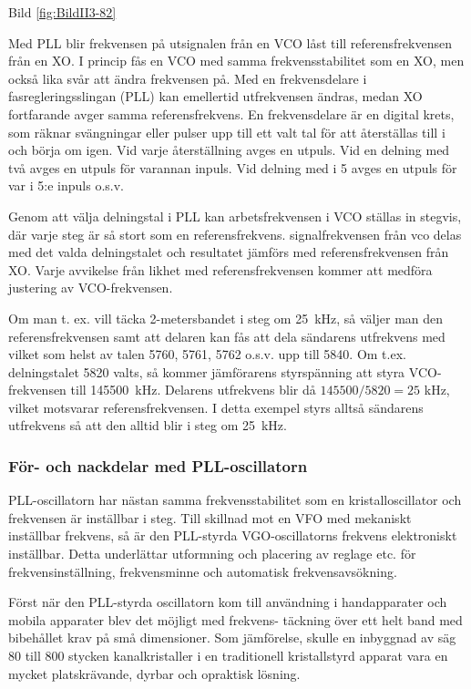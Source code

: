 Bild \ref{fig:BildII3-82}

Med PLL blir frekvensen på utsignalen från en VCO låst till
referensfrekvensen från en XO. I princip fås en VCO med samma
frekvensstabilitet som en XO, men också lika svår att ändra frekvensen
på. Med en frekvensdelare i fasregleringsslingan (PLL) kan emellertid
utfrekvensen ändras, medan XO fortfarande avger samma
referensfrekvens.  En frekvensdelare är en digital krets, som räknar
svängningar eller pulser upp till ett valt tal för att återställas
till i och börja om igen. Vid varje återställning avges en utpuls.
Vid en delning med två avges en utpuls för varannan inpuls. Vid
delning med i 5 avges en utpuls för var i 5:e inpuls o.s.v.

Genom att välja delningstal i PLL kan arbetsfrekvensen i VCO ställas
in stegvis, där varje steg är så stort som en
referensfrekvens. signalfrekvensen från vco delas med det valda
delningstalet och resultatet jämförs med referensfrekvensen från XO.
Varje avvikelse från likhet med referensfrekvensen kommer att
medföra justering av VCO-frekvensen.

Om man t. ex. vill täcka 2-metersbandet i steg om 25~kHz, så väljer
man den referensfrekvensen samt att delaren kan fås att dela sändarens
utfrekvens med vilket som helst av talen 5760, 5761, 5762 o.s.v. upp
till 5840. Om t.ex. delningstalet 5820 valts, så kommer jämförarens
styrspänning att styra VCO-frekvensen till 145500~kHz. Delarens
utfrekvens blir då \(145500/5820 = 25\) kHz, vilket motsvarar
referensfrekvensen. I detta exempel styrs alltså sändarens utfrekvens
så att den alltid blir i steg om 25~kHz.

\subsubsection{För- och nackdelar med PLL-oscillatorn}

PLL-oscillatorn har nästan samma frekvensstabilitet som en
kristalloscillator och frekvensen är inställbar i steg. Till skillnad
mot en VFO med mekaniskt inställbar frekvens, så är den PLL-styrda
VGO-oscillatorns frekvens elektroniskt inställbar. Detta underlättar
utformning och placering av reglage etc. för frekvensinställning,
frekvensminne och automatisk frekvensavsökning.

Först när den PLL-styrda oscillatorn kom till användning i
handapparater och mobila apparater blev det möjligt med frekvens-
täckning över ett helt band med bibehållet krav på små
dimensioner. Som jämförelse, skulle en inbyggnad av säg 80 till 800
stycken kanalkristaller i en traditionell kristallstyrd apparat vara
en mycket platskrävande, dyrbar och opraktisk lösning.

